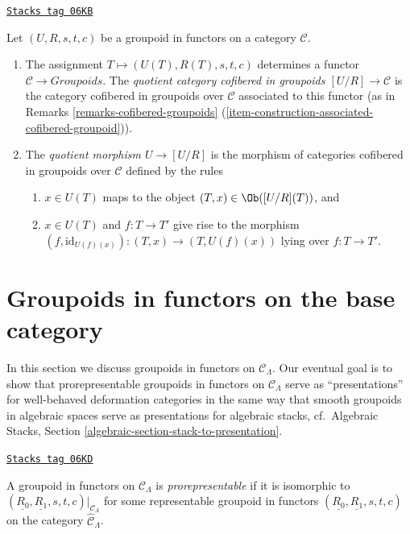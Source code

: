 \begin{definition}[Quotient]
\label{formal-defos-definition-quotient}
\href{https://stacks.math.columbia.edu/tag/06KB}{\texttt{Stacks tag 06KB}}

Let $(U, R, s, t, c)$ be a groupoid in functors on a category $\mathcal{C}$.
\begin{enumerate}
\item The assignment $T \mapsto  (U(T), R(T), s, t, c)$ determines a functor
$\mathcal{C} \to \textit{Groupoids}$. The {\it quotient category
cofibered in groupoids $[U/R] \to \mathcal{C}$} is the category
cofibered in groupoids over $\mathcal{C}$ associated to this functor (as in
Remarks \ref{remarks-cofibered-groupoids}
(\ref{item-construction-associated-cofibered-groupoid})).
\item The {\it quotient morphism $U \to [U/R]$} is the morphism of
categories cofibered in groupoids over $\mathcal{C}$ defined by the
rules
\begin{enumerate}
\item $x \in U(T)$ maps to the object $(T, x) \in \Ob([U/R](T))$, and
\item $x \in U(T)$ and $f : T \to T'$ give rise to the morphism
$(f, \text{id}_{U(f)(x)}): (T, x) \to (T, U(f)(x))$ lying over
$f : T \to T'$.
\end{enumerate}
\end{enumerate}
\end{definition}

\section{Groupoids in functors on the base category}
\label{formal-defos-section-prorepresentable-groupoids-in-functors}
In this section we discuss groupoids in functors on $\mathcal{C}_\Lambda$.
Our eventual goal is to show that prorepresentable groupoids
in functors on $\mathcal{C}_\Lambda$ serve as ``presentations''
for well-behaved deformation categories in the same way that
smooth groupoids in algebraic spaces serve as presentations for
algebraic stacks,
cf.\ Algebraic Stacks, Section \ref{algebraic-section-stack-to-presentation}.

\begin{definition}
\label{formal-defos-definition-prorepresentable-groupoid-in-functors}
\href{https://stacks.math.columbia.edu/tag/06KD}{\texttt{Stacks tag 06KD}}

A groupoid in functors on $\mathcal{C}_\Lambda$ is {\it prorepresentable}
if it is isomorphic to
$(\underline{R_0}, \underline{R_1}, s, t, c)|_{\mathcal{C}_\Lambda}$
for some representable groupoid in functors
$(\underline{R_0}, \underline{R_1}, s, t, c)$ on the category
$\widehat{\mathcal{C}}_\Lambda$.
\end{definition}

